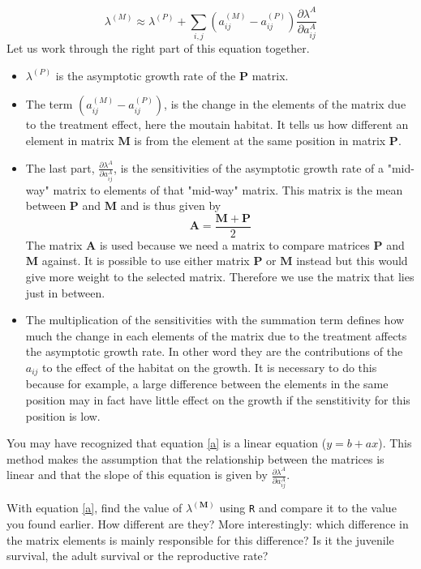 \documentclass{article}\usepackage[]{graphicx}\usepackage[]{color}
\begin{document}
\begin{equation}\label{a}
\lambda^{(M)} \approx \lambda^{(P)}+\sum_{i,j}{(a^{(M)}_{ij}-a^{(P)}_{ij})} \frac{ \partial\lambda^{A}}{\partial a^{A}_{ij}}
\end{equation}
Let us work through the right part of this equation together. 
\begin{itemize}
\item $\lambda^{(P)}$ is the asymptotic growth rate of the $\boldsymbol{P}$ matrix. 
\item The term ${(a^{(M)}_{ij}-a^{(P)}_{ij})}$, is the change in the elements of the matrix due to the treatment effect, here the moutain habitat. It tells us how different an element in matrix $\boldsymbol{M}$ is from the element at the same position in matrix $\boldsymbol{P}$.
\item The last part, $\frac{ \partial\lambda^{A}}{\partial a^{A}_{ij}}$, is the sensitivities of the asymptotic growth rate of a "mid-way" matrix to elements of that "mid-way" matrix. This matrix is the mean between $\boldsymbol{P}$ and $\boldsymbol{M}$ and is thus given by 
\begin{equation}
\boldsymbol{A}=\frac{\boldsymbol{M}+\boldsymbol{P}}{2}
\end{equation}
The matrix $\boldsymbol{A}$ is used because we need a matrix to compare matrices $\boldsymbol{P}$ and $\boldsymbol{M}$ against. It is possible to use either matrix $\boldsymbol{P}$ or $\boldsymbol{M}$ instead but this would give more weight to the selected matrix. Therefore we use the matrix that lies just in between.
\item The multiplication of the sensitivities with the summation term defines how much the change in each elements of the matrix due to the treatment affects the asymptotic growth rate. In other word they are the contributions of the $a_{ij}$ to the effect of the habitat on the growth. It is necessary to do this because for example, a large difference between the elements in the same position may in fact have little effect on the growth if the senstitivity for this position is low. 
\end{itemize}

You may have recognized that equation \ref{a} is a linear equation ($y=b+ax$). This method makes the assumption that the relationship between the matrices is linear and that the slope of this equation is given by $\frac{ \partial\lambda^{A}}{\partial a^{A}_{ij}}$.


With equation \ref{a}, find the value of $\lambda^{(\boldsymbol{M})}$ using \texttt{R} and compare it to the value you found earlier. How different are they? More interestingly: which difference in the matrix elements is mainly responsible for this difference? Is it the juvenile survival, the adult survival or the reproductive rate?\\[1.5ex]
\end{document}
